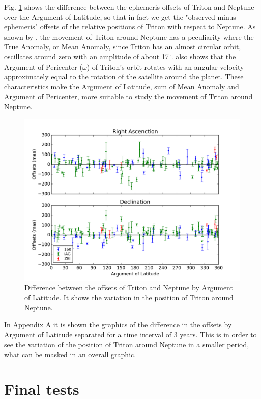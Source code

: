 \documentclass[12pt,a4paper]{report}
\newcommand{\degr}{\ensuremath{^{\circ}}}%
\begin{document}
Fig. \ref{Fig:triton-netuno-anom} shows the difference between the ephemeris offsets of Triton and Neptune over the Argument of Latitude, so that in fact we get the "observed minus ephemeris" offsets of the relative positions of Triton with respect to Neptune. As shown by \cite{Emelyanov2015}, the movement of Triton around Neptune has a peculiarity where the True Anomaly, or Mean Anomaly, since Triton has an almost circular orbit, oscillates around zero with an amplitude of about 17\degr. \cite{Emelyanov2015} also shows that the Argument of Pericenter ($\omega$) of Triton's orbit rotates with an angular velocity approximately equal to the rotation of the satellite around the planet. These characteristics make the Argument of Latitude, sum of Mean Anomaly and Argument of Pericenter, more suitable to study the movement of Triton around Neptune.

\begin{figure}[H]
\includegraphics[width=16.0cm]{Anom_TN.png} 
\caption{Difference between the offsets of Triton and Neptune by Argument of Latitude. It shows the variation in the position of Triton around Neptune.}
\label{Fig:triton-netuno-anom}
\end{figure}

In Appendix A it is shown the graphics of the difference in the offsets by Argument of Latitude separated for a time interval of 3 years. This is in order to see the variation of the position of Triton around Neptune in a smaller period, what can be masked in an overall graphic.

\section*{Final tests}
\end{document}
